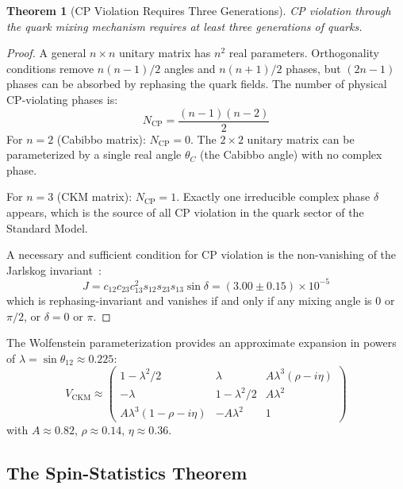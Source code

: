 \documentclass[12pt]{article}
\newtheorem{theorem}{Theorem}[section]
\theoremstyle{definition}
\theoremstyle{remark}
\begin{document}
\begin{theorem}[CP Violation Requires Three Generations]
\label{thm:cpviolation}
CP violation through the quark mixing mechanism requires at least three generations of quarks.
\end{theorem}

\begin{proof}
A general $n \times n$ unitary matrix has $n^2$ real parameters. Orthogonality conditions remove $n(n-1)/2$ angles and $n(n+1)/2$ phases, but $(2n-1)$ phases can be absorbed by rephasing the quark fields. The number of physical CP-violating phases is:
\begin{equation}
N_{\mathrm{CP}} = \frac{(n-1)(n-2)}{2}
\end{equation}
For $n = 2$ (Cabibbo matrix): $N_{\mathrm{CP}} = 0$. The $2 \times 2$ unitary matrix can be parameterized by a single real angle $\theta_C$ (the Cabibbo angle) with no complex phase.

For $n = 3$ (CKM matrix): $N_{\mathrm{CP}} = 1$. Exactly one irreducible complex phase $\delta$ appears, which is the source of all CP violation in the quark sector of the Standard Model.

A necessary and sufficient condition for CP violation is the non-vanishing of the Jarlskog invariant~\cite{Jarlskog1985}:
\begin{equation}
\label{eq:jarlskog}
J = c_{12} c_{23} c_{13}^2 s_{12} s_{23} s_{13} \sin\delta = (3.00 \pm 0.15) \times 10^{-5}
\end{equation}
which is rephasing-invariant and vanishes if and only if any mixing angle is $0$ or $\pi/2$, or $\delta = 0$ or $\pi$.
\end{proof}

The Wolfenstein parameterization provides an approximate expansion in powers of $\lambda = \sin\theta_{12} \approx 0.225$:
\begin{equation}
\label{eq:wolfenstein}
V_{\mathrm{CKM}} \approx \begin{pmatrix}
1 - \lambda^2/2 & \lambda & A\lambda^3(\rho - i\eta) \\
-\lambda & 1 - \lambda^2/2 & A\lambda^2 \\
A\lambda^3(1 - \rho - i\eta) & -A\lambda^2 & 1
\end{pmatrix}
\end{equation}
with $A \approx 0.82$, $\rho \approx 0.14$, $\eta \approx 0.36$.

\subsection{The Spin-Statistics Theorem}
\end{document}
